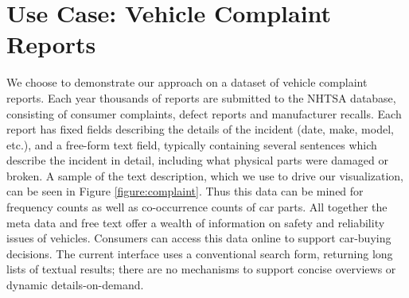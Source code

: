 \section{Use Case: Vehicle Complaint Reports}
We choose to demonstrate our approach on a dataset of vehicle complaint
reports. Each year thousands of reports are submitted to the
NHTSA database, consisting of consumer complaints, defect reports
and manufacturer recalls. Each report has fixed fields describing the
details of the incident (date, make, model, etc.), and a free-form text
field, typically containing several sentences which describe the incident
in detail, including what physical parts were damaged or broken. A sample of the
text description, which we use to drive our visualization, can be seen in Figure
\ref{figure:complaint}. Thus this data can be mined for frequency counts as
well as co-occurrence counts of car parts. All together the meta data and free
text offer a wealth of information on safety and reliability issues of
vehicles. Consumers can access this data online to support car-buying
decisions. The current interface uses a conventional search form, returning
long lists of textual results; there are no mechanisms to support
concise overviews or dynamic details-on-demand. 


 

% 
 
